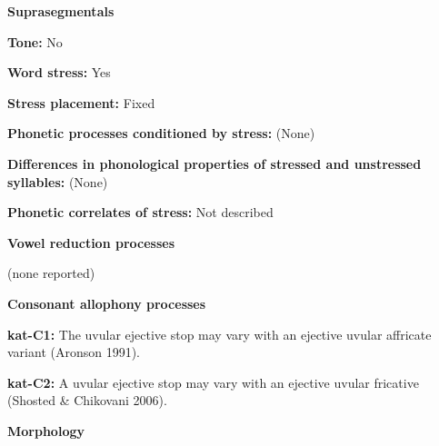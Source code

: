 \begin{styleBody}
\textbf{Suprasegmentals}
\end{styleBody}

\begin{styleBody}
\textbf{Tone:} No
\end{styleBody}

\begin{styleBody}
\textbf{Word stress:} Yes
\end{styleBody}

\begin{styleBody}
\textbf{Stress placement:} Fixed
\end{styleBody}

\begin{styleBody}
\textbf{Phonetic processes conditioned by stress:} (None)
\end{styleBody}

\begin{styleBody}
\textbf{Differences in phonological properties of stressed and unstressed syllables:} (None)
\end{styleBody}

\begin{styleBody}
\textbf{Phonetic correlates of stress: }Not described
\end{styleBody}

\begin{styleBody}
\textbf{Vowel reduction processes}
\end{styleBody}

\begin{styleBody}
(none reported)
\end{styleBody}

\begin{styleBody}
\textbf{Consonant allophony processes}
\end{styleBody}

\begin{styleBody}
\textbf{kat-C1: }The uvular ejective stop may vary with an ejective uvular affricate variant (Aronson 1991).
\end{styleBody}

\begin{styleBody}
\textbf{kat-C2: }A uvular ejective stop may vary with an ejective uvular fricative (Shosted \& Chikovani 2006).
\end{styleBody}

\begin{styleBody}
\textbf{Morphology}
\end{styleBody}

